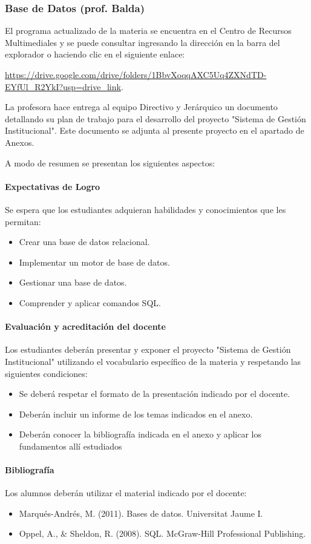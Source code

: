 \subsubsection{Base de Datos (prof. Balda)}       

El programa actualizado de la materia se encuentra en el Centro de Recursos Multimediales y se puede consultar ingresando la dirección en la barra del explorador o haciendo clic en el siguiente enlace:

\url{https://drive.google.com/drive/folders/1BbvXoqqAXC5Uq4ZXNdTD-EYfUl_R2YkI?usp=drive_link}.

La profesora hace entrega al equipo Directivo y Jerárquico un documento detallando su plan de trabajo para el desarrollo del proyecto "Sistema de Gestión Institucional". Este documento se adjunta al presente proyecto en el apartado de Anexos.

A modo de resumen se presentan los siguientes aspectos:
\paragraph{Expectativas de Logro}
Se espera que los estudiantes adquieran habilidades y conocimientos que les permitan: 
\begin{itemize}
    \item Crear una base de datos relacional.
    \item Implementar un motor de base de datos.
    \item Gestionar una base de datos.
    \item Comprender y aplicar comandos SQL. 
\end{itemize}


\paragraph{Evaluación y acreditación del docente}
Los estudiantes deberán presentar y exponer el proyecto "Sistema de Gestión Institucional" utilizando el vocabulario específico de la materia y respetando las siguientes condiciones:
\begin{itemize}
    \item Se deberá respetar el formato de la presentación indicado por el docente.
    \item Deberán incluir un informe de los temas indicados en el anexo.
    \item Deberán conocer la bibliografía indicada en el anexo y aplicar los fundamentos allí estudiados
\end{itemize}
\paragraph{Bibliografía} Los alumnos deberán utilizar el material indicado por el docente:
\begin{itemize}
    \item Marqués-Andrés, M. (2011). Bases de datos. Universitat Jaume I.
    \item  Oppel, A., \& Sheldon, R. (2008). SQL. McGraw-Hill Professional Publishing.
\end{itemize}
